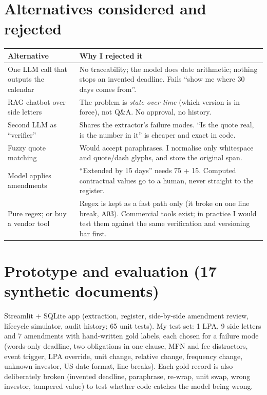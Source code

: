 \documentclass[10pt,a4paper]{article}
\begin{document}
\section{Alternatives considered and rejected}
{\small\begin{tabularx}{\linewidth}{@{}p{4.1cm}L@{}}
\toprule
\textbf{Alternative} & \textbf{Why I rejected it}\\
\midrule
One LLM call that outputs the calendar & No traceability; the model does date arithmetic; nothing stops an invented deadline. Fails ``show me where 30 days comes from''.\\
RAG chatbot over side letters & The problem is \emph{state over time} (which version is in force), not Q\&A. No approval, no history.\\
Second LLM as ``verifier'' & Shares the extractor's failure modes. ``Is the quote real, is the number in it'' is cheaper and exact in code.\\
Fuzzy quote matching & Would accept paraphrases. I normalise only whitespace and quote/dash glyphs, and store the original span.\\
Model applies amendments & ``Extended by 15 days'' needs 75 + 15. Computed contractual values go to a human, never straight to the register.\\
Pure regex; or buy a vendor tool & Regex is kept as a fast path only (it broke on one line break, A03). Commercial tools exist; in practice I would test them against the same verification and versioning bar first.\\
\bottomrule
\end{tabularx}\par}

\section{Prototype and evaluation (17 synthetic documents)}
Streamlit + SQLite app (extraction, register, side-by-side amendment review, lifecycle simulator, audit history; 65 unit tests). My test set: 1 LPA, 9 side letters and 7 amendments with hand-written gold labels, each chosen for a failure mode (words-only deadline, two obligations in one clause, MFN and fee distractors, event trigger, LPA override, unit change, relative change, frequency change, unknown investor, US date format, line breaks). Each gold record is also deliberately broken (invented deadline, paraphrase, re-wrap, unit swap, wrong investor, tampered value) to test whether code catches the model being wrong.
\end{document}
